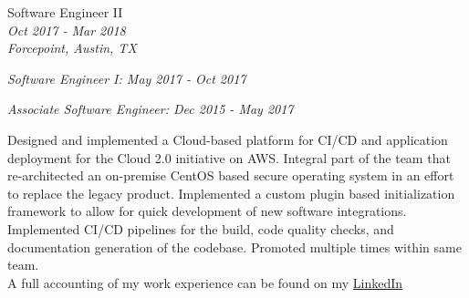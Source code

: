 \documentclass[10pt]{article} %
\begin{document}
\begin{minipage}[t]{0.5\textwidth}
{
\raggedright\large  Software Engineer II\\
\small \textit{Oct 2017 - Mar 2018}\\
\small \textit{Forcepoint, Austin, TX}\\
\raggedright\small \textit{Software Engineer I: May 2017 - Oct 2017}\\
\raggedright\small \textit{Associate Software Engineer: Dec 2015 - May 2017}\\
[5pt]
}

\normalsize{Designed and implemented a Cloud-based platform for CI/CD and application deployment for the Cloud 2.0 initiative on AWS. Integral part of the team that re-architected an on-premise CentOS based secure operating system in an effort to replace the legacy product. Implemented a custom plugin based initialization framework to allow for quick development of new software integrations. Implemented CI/CD pipelines for the build, code quality checks, and documentation generation of the codebase. Promoted multiple times within same team.}\\


A full accounting of my work experience can be found on my  \href{https://www.linkedin.com/in/mason-egger/}{LinkedIn}\\ 

\end{minipage}
\hfill
\end{document}
